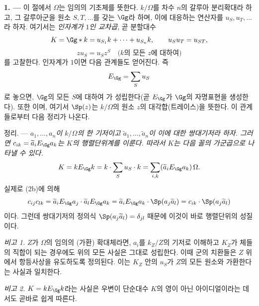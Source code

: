 
\noindent\textbf{1. ---} 이 절에서 $\Omega$는 임의의 기초체를 뜻한다. $k/\Omega$를 차수 $n$의 갈루아 분리확대라 하고, 그 갈루아군을 원소 $S,T,\ldots$를 갖는 $\Gg$라 하며, 이에 대응하는 연산자를 $u_S,u_T,\ldots$라 하자. 여기서는 \emph{인자계가 $1$인 교차곱}, 곧 분할대수
\[
K=\Gg\ast k=u_{S_1}k+\cdots+u_{S_n}k,\qquad u_Su_T=u_{ST},
\]
\[
zu_S=u_Sz^S\quad\text{($k$의 모든 $z$에 대하여)}
\]
를 고찰한다. 인자계가 $1$이면 다음 관계들도 얻어진다. 즉
\[
E_\Gg=\sum_Su_S
\]
로 놓으면, $\Gg$의 모든 $S$에 대하여
가 성립한다(곧 $E_\Gg$가 $\Gg$의 자명표현을 생성한다). 또한
이며, 여기서 $\Sp(z)$는 $k/\Omega$의 원소 $z$의 대각합(트레이스)을 뜻한다. 이 관계들로부터 다음 정리가 나온다.

\medskip
\noindent\textsc{정리. ---} \emph{$a_1,\ldots,a_n$이 $k/\Omega$의 한 기저이고 $\widetilde a_1,\ldots,\widetilde a_n$이 이에 대한 쌍대기저라 하자. 그러면 $c_{ik}=\widetilde a_iE_\Gg a_k$는 $K$의 행렬단위계를 이룬다. 따라서 $K$는 다음 꼴의 가군곱으로 나타낼 수 있다.}
\[
K=kE_\Gg k=k\cdot\sum_Su_S\cdot k
 =\sum_{i,k}(\widetilde a_iE_\Gg a_k)\,\Omega.
\]
실제로 (2b)에 의해
\[
c_{ij}c_{lk}
 =\widetilde a_iE_\Gg a_j\cdot\widetilde a_lE_\Gg a_k
 =\widetilde a_iE_\Gg a_k\cdot\Sp(a_j\widetilde a_l)
 =c_{ik}\cdot\Sp(a_j\widetilde a_l)
\]
이다. 그런데 쌍대기저의 정의식 $\Sp(a_j\widetilde a_l)=\delta_{jl}$ 때문에 이것이 바로 행렬단위의 성질이다.

\emph{비고 1.} $Z$가 $\Omega$의 임의의 (가환) 확대체라면, $a_i$를 $k_Z/Z$의 기저로 이해하고 $K_Z$가 체들의 직합이 되는 경우에도 위의 모든 사실은 그대로 성립한다. 이때 군의 치환들은 $Z$ 위에서 항등사상을 유도하도록 정의된다. 이는 $K_Z$ 안의 $u_S$가 $Z$의 모든 원소와 가환한다는 사실과 일치한다.

\emph{비고 2.} $K=kE_\Gg k$라는 사실은 우변이 단순대수 $K$의 영이 아닌 아이디얼이라는 데서도 곧바로 쉽게 따른다.
